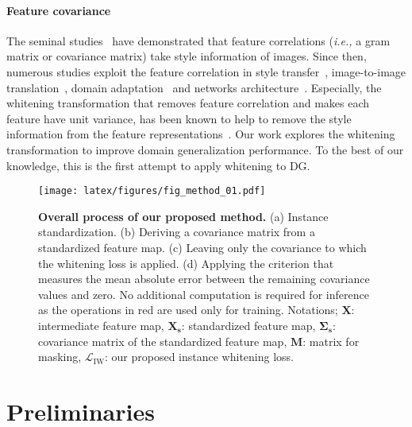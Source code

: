 \documentclass[final]{latex/cvpr}
\begin{document}
\vspace{-0.45cm}
\paragraph{Feature covariance}
The seminal studies~\cite{gatys2015texture,gatys2016image} have demonstrated that feature correlations (\textit{i.e.,} a gram matrix or covariance matrix) take style information of images. Since then, numerous studies exploit the feature correlation in style transfer~\cite{li2017universal}, image-to-image translation~\cite{cho2019image}, domain adaptation~\cite{roy2019unsupervised,sun2016deep} and networks architecture~\cite{luo2017learning,pan2019switchable,huang2018decorrelated,siarohin2018whitening}. Especially, the whitening transformation that removes feature correlation and makes each feature have unit variance, has been known to help to remove the style information from the feature representations~\cite{li2017universal,pan2019switchable,cho2019image}. Our work explores the whitening transformation to improve domain generalization performance. To the best of our knowledge, this is the first attempt to apply whitening to DG.


\begin{figure*}[ht!]
\vspace*{-0.0cm}
  \centering\texttt{[image: latex/figures/fig\_method\_01.pdf]}
  \vspace*{-0.0cm}
  \caption{\textbf{Overall process of our proposed method.} (a) Instance standardization. (b) Deriving a covariance matrix from a standardized feature map. (c) Leaving only the covariance to which the whitening loss is applied. 
  (d) Applying the criterion that measures the mean absolute error between the remaining covariance values and zero. No additional computation is required for inference as the operations in red are used only for training.
  Notations; $\mathbf{X}$: intermediate feature map, $\mathbf{X_s}$: standardized feature map, $\mathbf{\Sigma_s}$: covariance matrix of the standardized feature map, $\mathbf{M}$: matrix for masking, $\mathcal{L}_{\text{IW}}$: our proposed instance whitening loss.
}
\label{fig:whitening_overview}
\vspace*{-0.4cm}
\end{figure*}


\vspace*{-0.05cm}
\section{Preliminaries}
\vspace*{-0.1cm}
\end{document}
